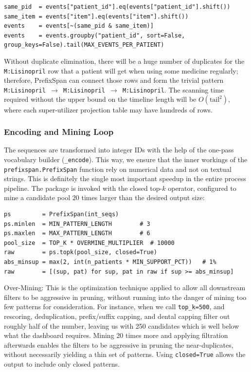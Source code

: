 \begin{lstlisting}[style=pythonstyle]
same_pid  = events["patient_id"].eq(events["patient_id"].shift())
same_item = events["item"].eq(events["item"].shift())
events    = events[~(same_pid & same_item)]
events    = events.groupby("patient_id", sort=False, group_keys=False).tail(MAX_EVENTS_PER_PATIENT)
\end{lstlisting}

\noindent Without duplicate elimination, there will be a huge number of duplicates for the \texttt{M:Lisinopril} row that a patient will get when using some medicine regularly; therefore, PrefixSpan can connect those rows and form the trivial pattern \texttt{M:Lisinopril \(\rightarrow\) M:Lisinopril \(\rightarrow\) M:Lisinopril}. The scanning time required without the upper bound on the timeline length will be \(O(\text{tail}^2)\), where each super-utilizer projection table may have hundreds of rows.

\subsubsection*{Encoding and Mining Loop}

The sequences are transformed into integer IDs with the help of the one-pass vocabulary builder (\texttt{\_encode}). This way, we ensure that the inner workings of the \texttt{prefixspan.PrefixSpan} function rely on numerical data and not on textual strings. This is definitely the single most important speedup in the entire process pipeline. The package is invoked with the closed top-\(k\) operator, configured to mine a candidate pool \(20\) times larger than the desired output size:

\begin{lstlisting}[style=pythonstyle]
ps         = PrefixSpan(int_seqs)
ps.minlen  = MIN_PATTERN_LENGTH        # 3
ps.maxlen  = MAX_PATTERN_LENGTH        # 6
pool_size  = TOP_K * OVERMINE_MULTIPLIER  # 10000
raw        = ps.topk(pool_size, closed=True)
abs_minsup = max(2, int(n_patients * MIN_SUPPORT_PCT))   # 1%
raw        = [(sup, pat) for sup, pat in raw if sup >= abs_minsup]

\end{lstlisting}

\noindent Over-Mining: This is the optimization technique applied to allow all downstream filters to be aggressive in pruning, without running into the danger of mining too few patterns for consideration. For instance, when we call \texttt{top\_k=500}, and rescoring, deduplication, prefix/suffix capping, and dental capping filter out roughly half of the number, leaving us with 250 candidates which is well below what the dashboard requires. Mining 20 times more and applying filtration afterwards enables the filters to be aggressive in pruning the near-duplicates, without necessarily yielding a thin set of patterns. Using \texttt{closed=True} allows the output to include only closed patterns.

